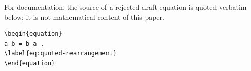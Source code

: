 \documentclass{article}
\begin{document}
For documentation, the source of a rejected draft equation is quoted
verbatim below; it is not mathematical content of this paper.
\begin{verbatim}
\begin{equation}
a b = b a .
\label{eq:quoted-rearrangement}
\end{equation}
\end{verbatim}
\end{document}
